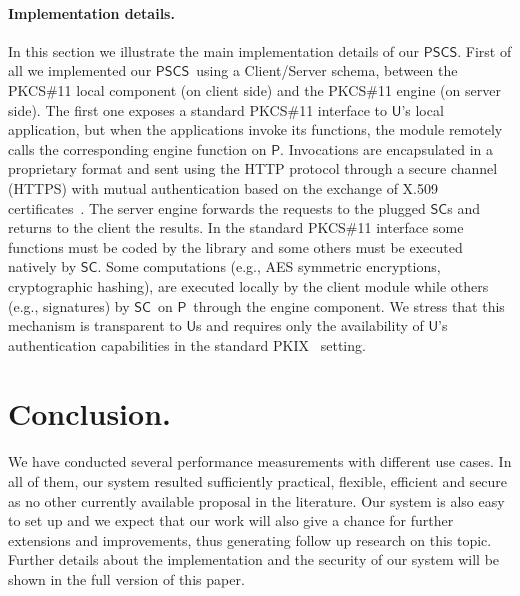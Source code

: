 \documentclass[runningheads]{llncs}
\newcommand{\User}{\ensuremath{\mathsf{U}}}
\newcommand{\Proxy}{\ensuremath{\mathsf{P}}}
\newcommand{\SC}{\ensuremath{\mathsf{SC}}}
\newcommand{\PSCS}{\ensuremath{\mathsf{PSCS}}}
\begin{document}
\paragraph{Implementation details.}
In this section we illustrate the main implementation details of our \PSCS. First of all we implemented our \PSCS\ using a Client/Server schema, between the PKCS\#11 local component (on client side) and the PKCS\#11 engine (on server side). The first one exposes a standard PKCS\#11 interface to \User's local application, but when the applications invoke its functions, the module remotely calls the corresponding engine function on \Proxy . Invocations are encapsulated in a proprietary format and sent using the HTTP protocol through a secure channel (HTTPS) with mutual authentication based on the exchange of X.509 certificates~\cite{PKIX}. The server engine forwards the requests to the plugged \SC s and returns to the client the results. In the standard PKCS\#11 interface some functions must be coded by the library and some others must be executed natively by \SC . Some computations (e.g., AES symmetric encryptions,  cryptographic hashing), are executed locally by the client module while others (e.g., signatures) by \SC\ on \Proxy\ through the engine component. We stress that this mechanism is transparent to \User s and requires only the availability of \User's authentication capabilities in the standard PKIX~\cite{PKIX} setting.

\section{Conclusion.}
We have conducted several performance measurements with different use cases. In all of them, our system resulted sufficiently practical, flexible, efficient and secure as no other currently available proposal in the literature.
Our system is also easy to set up and we expect that our work will also give a chance for further extensions and improvements, thus generating follow up research on this topic. Further details about the implementation and the security of our
system will be shown in the full version of this paper.
\end{document}
